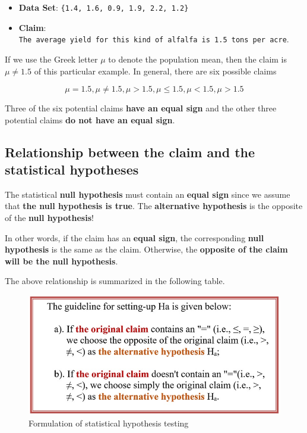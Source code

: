 \documentclass[
]{book}
\providecommand{\tightlist}{%
  \setlength{\itemsep}{0pt}\setlength{\parskip}{0pt}}
\begin{document}
\begin{itemize}
\tightlist
\item
  \textbf{Data Set}: \texttt{\{1.4,\ 1.6,\ 0.9,\ 1.9,\ 2.2,\ 1.2\}}
\item
  \textbf{Claim}: \texttt{The\ average\ yield\ for\ this\ kind\ of\ alfalfa\ is\ 1.5\ tons\ per\ acre}.
\end{itemize}

If we use the Greek letter \(\mu\) to denote the population mean, then the claim is \(\mu \ne 1.5\) of this particular example. In general, there are six possible claims

\[\mu = 1.5, \mu \ne 1.5, \mu > 1.5, \mu \le 1.5, \mu < 1.5, \mu > 1.5 \]

Three of the six potential claims \textbf{have an equal sign} and the other three potential claims \textbf{do not have an equal sign}.

\hypertarget{relationship-between-the-claim-and-the-statistical-hypotheses}{%
\subsection{Relationship between the claim and the statistical hypotheses}\label{relationship-between-the-claim-and-the-statistical-hypotheses}}

The statistical \textbf{null hypothesis} must contain an \textbf{equal sign} since we assume that \textbf{the null hypothesis is true}. The \textbf{alternative hypothesis} is the opposite of the \textbf{null hypothesis}!

In other words, if the claim has an \textbf{equal sign}, the corresponding \textbf{null hypothesis} is the same as the claim. Otherwise, the \textbf{opposite of the claim will be the null hypothesis}.

The above relationship is summarized in the following table.

\begin{figure}

{\centering \includegraphics[width=0.8\linewidth]{img07/w07-claim-null-hypothesis} 

}

\caption{Formulation of statistical hypothesis testing}\label{fig:unnamed-chunk-109}
\end{figure}
\end{document}
